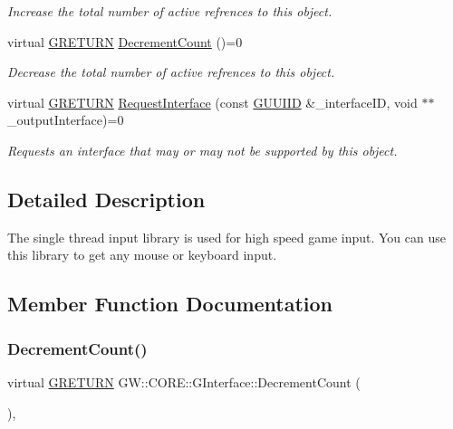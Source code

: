 \begin{DoxyCompactItemize}
\begin{DoxyCompactList}\small\item\em Increase the total number of active refrences to this object. \end{DoxyCompactList}\item 
virtual \hyperlink{namespace_g_w_a69b1aaebac1cac8049825f035884c95b}{G\+R\+E\+T\+U\+RN} \hyperlink{class_g_w_1_1_c_o_r_e_1_1_g_interface_af6924e12b14f217b518fc91c63d9703d}{Decrement\+Count} ()=0
\begin{DoxyCompactList}\small\item\em Decrease the total number of active refrences to this object. \end{DoxyCompactList}\item 
virtual \hyperlink{namespace_g_w_a69b1aaebac1cac8049825f035884c95b}{G\+R\+E\+T\+U\+RN} \hyperlink{class_g_w_1_1_c_o_r_e_1_1_g_interface_ab1414aa07bca310a824ee01a91657ad0}{Request\+Interface} (const \hyperlink{struct_g_w_1_1_g_u_u_i_i_d}{G\+U\+U\+I\+ID} \&\+\_\+interface\+ID, void $\ast$$\ast$\+\_\+output\+Interface)=0
\begin{DoxyCompactList}\small\item\em Requests an interface that may or may not be supported by this object. \end{DoxyCompactList}\end{DoxyCompactItemize}


\subsection{Detailed Description}
The single thread input library is used for high speed game input. You can use this library to get any mouse or keyboard input. 

\subsection{Member Function Documentation}
\hypertarget{class_g_w_1_1_c_o_r_e_1_1_g_interface_af6924e12b14f217b518fc91c63d9703d}{}\label{class_g_w_1_1_c_o_r_e_1_1_g_interface_af6924e12b14f217b518fc91c63d9703d} 
\subsubsection{\texorpdfstring{Decrement\+Count()}{DecrementCount()}}
{\footnotesize\ttfamily virtual \hyperlink{namespace_g_w_a69b1aaebac1cac8049825f035884c95b}{G\+R\+E\+T\+U\+RN} G\+W\+::\+C\+O\+R\+E\+::\+G\+Interface\+::\+Decrement\+Count (\begin{DoxyParamCaption}{ }\end{DoxyParamCaption})\hspace{0.3cm}{\ttfamily [pure virtual]}, {\ttfamily [inherited]}}

